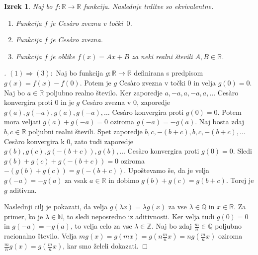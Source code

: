 \documentclass[a4paper,12pt]{article}
\theoremstyle{definition}
\theoremstyle{plain}
\newtheorem{izrek}{Izrek}
\newenvironment{dokaz}{\begin{proof}[\bfseries\upshape\proofname]}{\end{proof}}
\begin{document}
\begin{izrek}
    \label{klaszvez}
    Naj bo $f: \mathbb{R} \rightarrow \mathbb{R}$ funkcija. Naslednje trditve so ekvivalentne.
    \begin{enumerate}
        \item Funkcija $f$ je Ces\`{a}ro zvezna v točki~$0$.
        \item Funkcija $f$ je Ces\`{a}ro zvezna.
        \item Funkcija $f$ je oblike $f(x) = Ax + B$ za neki realni števili $A, B \in \mathbb{R}$.
    \end{enumerate}
\end{izrek}
\begin{dokaz}
    $(1) \Rightarrow (3): $ Naj bo funkcija $g: \mathbb{R} \rightarrow \mathbb{R}$ definirana s predpisom $g(x) = f(x) - f(0)$. Potem je $g$ Ces\`{a}ro zvezna v točki $0$ in velja $g(0) = 0$. 
    Naj bo $a \in \mathbb{R}$ poljubno realno število. Ker zaporedje $a, -a, a, -a, a, \ldots$ Ces\`{a}ro konvergira proti $0$ in je $g$ Ces\`{a}ro zvezna v $0$, zaporedje $g(a), g(-a), g(a), g(-a), \ldots$ Ces\`{a}ro konvergira proti $g(0) = 0$. Potem mora veljati $g(a) + g(-a) = 0$ oziroma $g(-a) = -g(a)$. 
    Naj bosta zdaj $b, c \in \mathbb{R}$ poljubni realni števili. Spet zaporedje $b, c, -(b+c), b, c, -(b+c), \ldots$ Ces\`{a}ro konvergira k $0$, zato tudi zaporedje $g(b), g(c), g(-(b+c)), g(b), \ldots$ Ces\`{a}ro konvergira proti $g(0) = 0$. Sledi $g(b) + g(c) + g(-(b+c)) = 0$ oziroma $-(g(b) + g(c)) = g(-(b+c))$. Upoštevamo še, da je velja $g(-a) = -g(a)$ za vsak $a \in \mathbb{R}$ in dobimo $g(b) + g(c) = g(b+c)$. Torej je $g$ aditivna.

    Naslednji cilj je pokazati, da velja $g(\lambda x) = \lambda g(x)$ za vse $\lambda \in \mathbb{Q}$ in $x \in \mathbb{R}$. Za primer, ko je $\lambda \in \mathbb{N}$, to sledi neposredno iz aditivnosti. Ker velja tudi $g(0) = 0$ in $g(-a) = -g(a)$, to velja celo za vse $\lambda \in \mathbb{Z}$. Naj bo zdaj $\frac{m}{n} \in \mathbb{Q}$ poljubno racionalno število. Velja $mg(x) = g(mx) = g\left( n\frac{m}{n}x \right) = ng\left(\frac{m}{n}x\right)$ oziroma $\frac{m}{n}g(x) = g \left(\frac{m}{n}x \right)$, kar smo želeli dokazati.


\end{dokaz}
\end{document}
